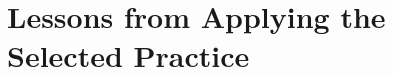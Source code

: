 \section{Lessons from Applying the Selected Practice}
\label{sec:Lessons from Applying the Selected Practice}
